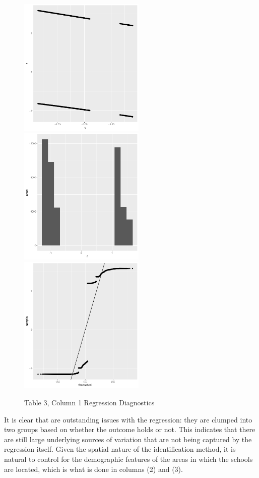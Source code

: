 \documentclass{article}
\begin{document}
\begin{figure}[!hbtp]
\centering
\caption{Table 3, Column 1 Regression Diagnostics}
\includegraphics[width=6cm]{../explore/Output/diagnostics/edu_OOSLogit1Plot.pdf}
\includegraphics[width=6cm]{../explore/Output/diagnostics/edu_OOSLogit1Hist.pdf}
\includegraphics[width=6cm]{../explore/Output/diagnostics/edu_OOSLogit1QQ.pdf}
\end{figure} 
It is clear that are outstanding issues with the regression: they are clumped into two groups based on whether the outcome holds or not. This indicates that there are still large underlying sources of variation that are not being captured by the regression itself. Given the spatial nature of the identification method, it is natural to control for the demographic features of the areas in which the schools are located, which is what is done in columns (2) and (3). 
\end{document}
